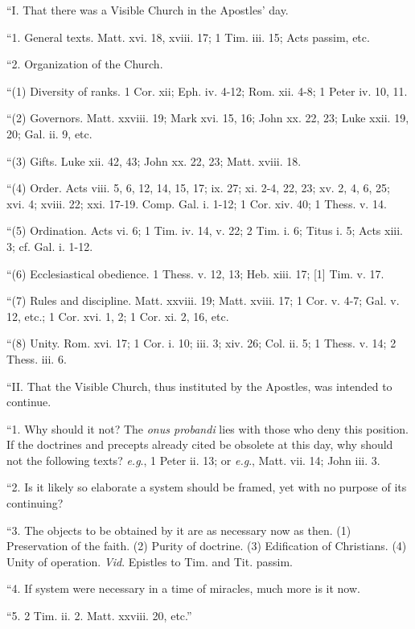 ``I. That there was a Visible Church in the Apostles' day.

``1. General texts. Matt. xvi. 18, xviii. 17; 1 Tim. iii. 15;
Acts passim, etc.

``2. Organization of the Church.

``(1) Diversity of ranks. 1 Cor. xii; Eph. iv. 4-12; Rom. xii.
4-8; 1 Peter iv. 10, 11.

``(2) Governors. Matt. xxviii. 19; Mark xvi. 15, 16; John xx.
22, 23; Luke xxii. 19, 20; Gal. ii. 9, etc.

``(3) Gifts. Luke xii. 42, 43; John xx. 22, 23; Matt. xviii.
18.

``(4) Order. Acts viii. 5, 6, 12, 14, 15, 17; ix. 27; xi.
2-4, 22, 23; xv. 2, 4, 6, 25; xvi. 4; xviii. 22; xxi. 17-19. Comp.
Gal. i. 1-12; 1 Cor. xiv. 40; 1 Thess. v. 14.

``(5) Ordination. Acts vi. 6; 1 Tim. iv. 14, v. 22; 2 Tim. i.
6; Titus i. 5; Acts xiii. 3; cf. Gal. i. 1-12.

``(6) Ecclesiastical obedience. 1 Thess. v. 12, 13; Heb. xiii.
17; [1] Tim. v. 17.

``(7) Rules and discipline. Matt. xxviii. 19; Matt. xviii. 17;
1 Cor. v. 4-7; Gal. v. 12, etc.; 1 Cor. xvi. 1, 2; 1 Cor. xi. 2, 16,
etc.

``(8) Unity. Rom. xvi. 17; 1 Cor. i. 10; iii. 3; xiv. 26; Col.
ii. 5; 1 Thess. v. 14; 2 Thess. iii. 6.

``II. That the Visible Church, thus instituted by the Apostles,
was intended to continue.

``1. Why should it not? The \emph{onus probandi} lies with
those who deny this position. If the doctrines and precepts already
cited be obsolete at this day, why should not the following texts? \emph{e.g}.,
1 Peter ii. 13; or \emph{e.g}., Matt. vii. 14; John iii. 3.

``2. Is it likely so elaborate a system should be framed, yet
with no purpose of its continuing?

``3. The objects to be obtained by it are as necessary now as
then. (1) Preservation of the faith. (2) Purity of doctrine. (3)
Edification of Christians. (4) Unity of operation. \emph{Vid}.
Epistles to Tim. and Tit. passim.

``4. If system were necessary in a time of miracles, much more
is it now.

``5. 2 Tim. ii. 2. Matt. xxviii. 20, etc.''

